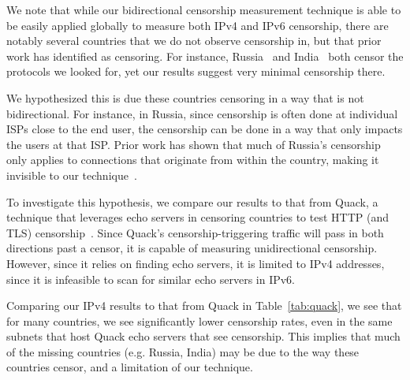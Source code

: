 \TabQuack

We note that while our bidirectional censorship measurement technique is able to
be easily applied globally to measure both IPv4 and IPv6 censorship, there are
notably several countries that we do not observe censorship in, but that prior
work has identified as censoring. For instance,
Russia~\cite{ramesh2020decentralized} and India~\cite{singh2020india} both
censor the protocols we looked for, yet our results suggest very minimal
censorship there.

We hypothesized this is due these countries censoring in a way that is not
bidirectional. For instance, in Russia, since censorship is often done at
individual ISPs close to the end user, the censorship can be done in a way that
only impacts the users at that ISP. Prior work has shown that much of Russia's
censorship only applies to connections that originate from within the country,
making it invisible to our technique~\cite{xue2021throttling}.

To investigate this hypothesis, we compare our results to that from Quack, a
technique that leverages echo servers in censoring countries to test HTTP (and
TLS) censorship~\cite{vandersloot2018quack}. Since Quack's censorship-triggering traffic will pass in both
directions past a censor, it is capable of measuring unidirectional censorship.
However, since it relies on finding echo servers, it is limited to IPv4
addresses, since it is infeasible to scan for similar echo servers in IPv6.

Comparing our IPv4 results to that from Quack in Table~\ref{tab:quack}, we see that for many countries,
we see significantly lower censorship rates, even in the same subnets that host
Quack echo servers that see censorship. This implies that much of the missing
countries (e.g. Russia, India) may be due to the way these countries censor, and
a limitation of our technique.

